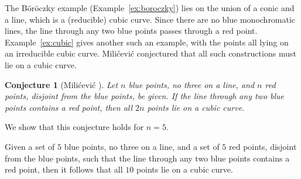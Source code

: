 \documentclass[a4paper,11pt,leqno]{article}
\newtheorem{conjecture}{Conjecture}
\begin{document}
The B\"or\"oczky example (Example~\ref{ex:boroczky}) lies on the union of a conic and a line, which is a (reducible) cubic curve.
Since there are no blue monochromatic lines, the line through any two blue points passes through a red point.
Example~\ref{ex:cubic} gives another such an example, with the points all lying on an irreducible cubic curve.
Mili\'cevi\'c \cite{milicevic2018} conjectured that all such constructions must lie on a cubic curve.
\begin{conjecture}[Mili\'cevi\'c \cite{milicevic2018}]
Let $n$ blue points, no three on a line, and $n$ red points, disjoint from the blue points, be given.
If the line through any two blue points contains a red point, then all $2n$ points lie on a cubic curve.
\end{conjecture}


We show that this conjecture holds for $n=5$.

\begin{theorem}\label{thm:Milicevic}
Given a set of $5$ blue points, no three on a line, and a set of $5$ red points, disjoint from the blue points, such that the line through any two blue points contains a red point, then it follows that all $10$ points lie on a cubic curve.
\end{theorem}
\end{document}
